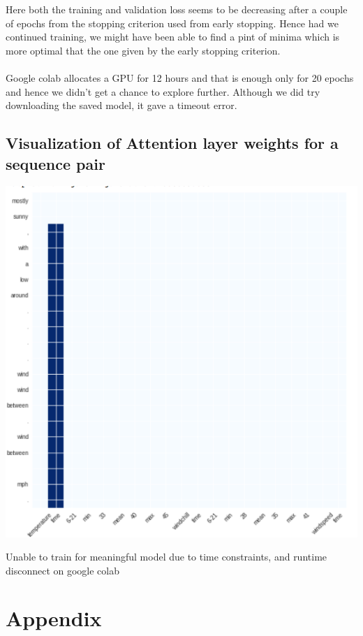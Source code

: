 \documentclass[12pt]{report}
\begin{document}
Here both the training and validation loss seems to be decreasing after a couple of epochs from the stopping criterion used from early stopping. Hence had we continued training, we might have been able to find a pint of minima which is more  optimal that the one given by the early stopping criterion.\\\\
Google colab allocates a GPU for 12 hours and that is enough only for 20 epochs and hence we didn't get a chance to explore further. Although we did try downloading the saved model, it gave a timeout error.
\subsection{Visualization of Attention layer weights for a sequence pair}
\begin{center}
\includegraphics[scale=0.5]{pic2.png}
\end{center}
Unable to train for meaningful model due to time constraints, and runtime disconnect on google colab
\section{Appendix}
\end{document}
